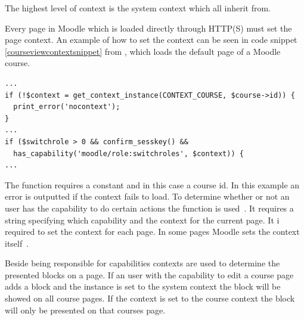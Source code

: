 The highest level of context is the system context which all inherit from. 

Every page in Moodle which is loaded directly through HTTP(S) must set the page context. 
An example of how to set the context can be seen in code snippet \ref{courseviewcontextsnippet} from , which loads the default page of a Moodle course.

\begin{lstlisting}[style=phpCode, caption=\myCaption{A snippet from \moodlefile{/course/view.php}}, label=courseviewcontextsnippet]
...
if (!$context = get_context_instance(CONTEXT_COURSE, $course->id)) {
  print_error('nocontext');
}
...
if ($switchrole > 0 && confirm_sesskey() &&
  has_capability('moodle/role:switchroles', $context)) {
...	
\end{lstlisting}
The function  requires a constant and in this case a course id. 
In this example an error is outputted if the context fails to load. 
To determine whether or not an user has the capability to do certain actions the function  is used~\cite{moodlerolesandmodules}. It requires a string specifying which capability and the context for the current page. 
It i required to set the context for each page. 
In some pages Moodle sets the context itself~\cite{moodlepageapi}. 

Beside being responsible for capabilities contexts are used to determine the presented blocks on a page. If an user with the capability to edit a course page adds a block and the instance is set to the system context the block will be showed on all course pages. If the context is set to the course context the block will only be presented on that courses page. 

	
	
	